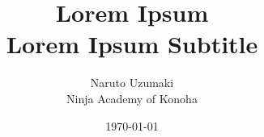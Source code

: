 \documentclass[11pt]{article}
\title{Lorem Ipsum\\\tiny Lorem Ipsum Subtitle}
\author{Naruto Uzumaki\\\tiny Ninja Academy of Konoha}
\date{\today}
\begin{document}
	\maketitle

	\Blinddocument
\end{document}

